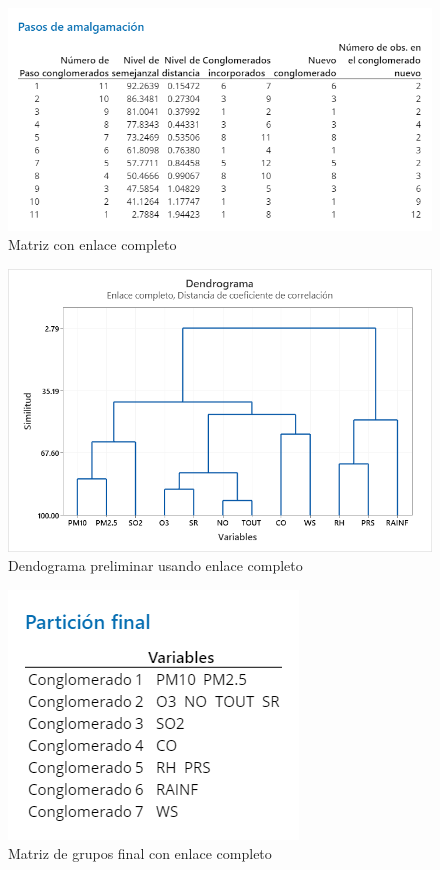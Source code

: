 \documentclass[journal, 10pt]{IEEEtran}                                                          %
\begin{document}
\begin{figure}[H]
    \centering
    \includegraphics[scale=.3]{matrizCompleto.png}
    \caption{Matriz con enlace completo}
    \label{fig:matrizCompleto}
\end{figure}

\begin{figure}[H]
    \centering
    \includegraphics[scale=.3]{gramaCompleto.png}
    \caption{Dendograma preliminar usando enlace completo}
    \label{fig:gramaCompleto}
\end{figure}

\begin{figure}[H]
    \centering
    \includegraphics[scale=.3]{matrizCompletoFinal.png}
    \caption{Matriz de grupos final con enlace completo}
    \label{fig:matrizCompletoFinal}
\end{figure}
\end{document}
